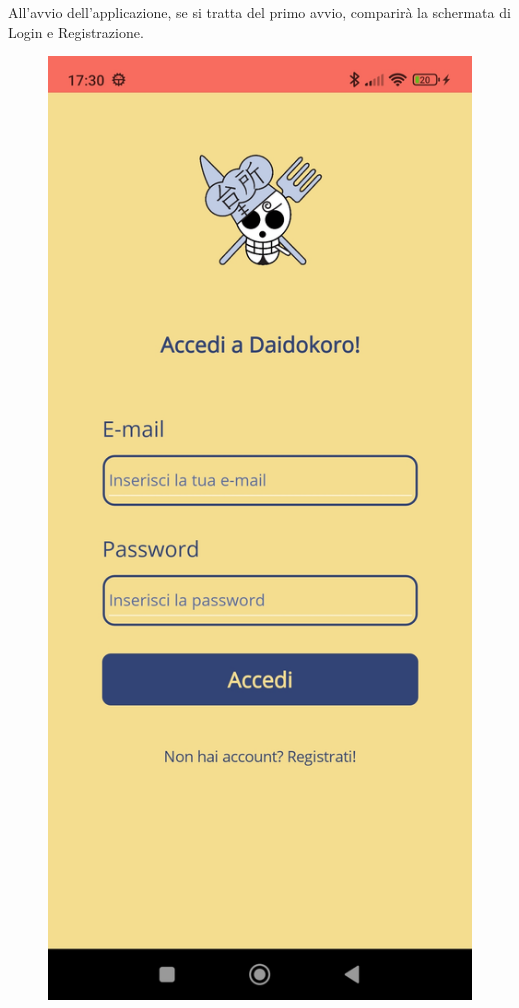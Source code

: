 ﻿\documentclass[a4paper,12pt]{report}
\begin{document}
All'avvio dell'applicazione, se si tratta del primo avvio, comparirà la schermata di Login e Registrazione.
\begin{figure}[h!]
    \begin{minipage}{.5\textwidth}
        \centering
        \includegraphics[width=0.9\linewidth]{app_images/Login.jpg}

\end{minipage}
\end{figure}
\end{document}
